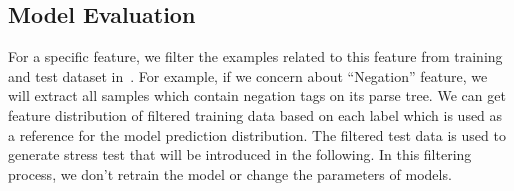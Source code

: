 


\subsection{Model Evaluation}
\label{sec:model}

For a specific feature, we filter the examples related to this feature from training and test dataset in~. 
For example, if we concern about ``Negation'' feature, we will extract all samples which contain negation tags on its parse tree. We can get feature distribution of filtered training data based on each label which is used as a reference for the model prediction distribution. The filtered test data is used to generate stress test that will be introduced in the following. 
In this filtering process, we don't retrain the model or change 
the parameters of models.

